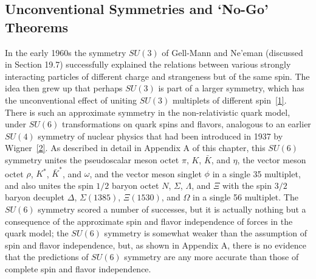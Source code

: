
\subsection{Unconventional Symmetries and `No-Go' Theorems}

In the early 1960s the symmetry $SU(3)$ of Gell-Mann and Ne'eman (discussed in
Section 19.7) successfully explained the relations between various strongly
interacting particles of different charge and strangeness but of the same spin.
The idea then grew up that perhaps $SU(3)$ is part of a larger symmetry, which
has the unconventional effect of uniting $SU(3)$ multiplets of different
spin~\hyperref[ch24-ref-1]{[1]}. There is such an approximate symmetry in the
non-relativistic quark model, under $SU(6)$ transformations on quark spins and
flavors, analogous to an earlier $SU(4)$ symmetry of nuclear physics that had
been introduced in 1937 by Wigner~\hyperref[ch24-ref-2]{[2]}. As described in
detail in Appendix A of this chapter, this $SU(6)$ symmetry unites the
pseudoscalar meson octet $\pi$, $K$, $\bar K$, and $\eta$, the vector meson
octet $\rho$, $K^*$, $\bar K^*$, and $\omega$, and the vector meson singlet
$\phi$ in a single 35 multiplet, and also unites the spin $1/2$ baryon octet
$N$, $\Sigma$, $\Lambda$, and $\Xi$ with the spin $3/2$ baryon decuplet
$\Delta$, $\Sigma(1385)$, $\Xi(1530)$, and $\Omega$ in a single 56 multiplet.
The $SU(6)$ symmetry scored a number of successes, but it is actually nothing
but a consequence of the approximate spin and flavor independence of forces in
the quark model; the $SU(6)$ symmetry is somewhat weaker than the assumption of
spin and flavor independence, but, as shown in Appendix A, there is no evidence
that the predictions of $SU(6)$ symmetry are any more accurate than those of
complete spin and flavor independence.

